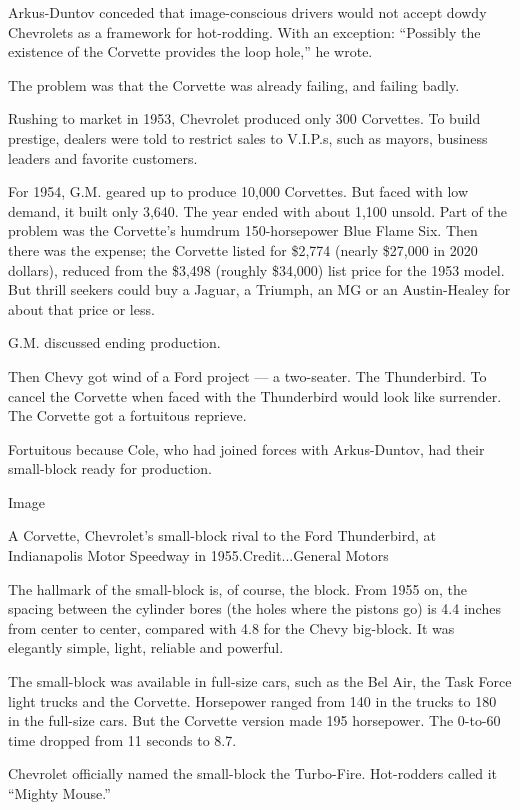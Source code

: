Arkus-Duntov conceded that image-conscious drivers would not accept
dowdy Chevrolets as a framework for hot-rodding. With an exception:
``Possibly the existence of the Corvette provides the loop hole,'' he
wrote.

The problem was that the Corvette was already failing, and failing
badly.

Rushing to market in 1953, Chevrolet produced only 300 Corvettes. To
build prestige, dealers were told to restrict sales to V.I.P.s, such as
mayors, business leaders and favorite customers.

For 1954, G.M. geared up to produce 10,000 Corvettes. But faced with low
demand, it built only 3,640. The year ended with about 1,100 unsold.
Part of the problem was the Corvette's humdrum 150-horsepower Blue Flame
Six. Then there was the expense; the Corvette listed for \$2,774 (nearly
\$27,000 in 2020 dollars), reduced from the \$3,498 (roughly \$34,000)
list price for the 1953 model. But thrill seekers could buy a Jaguar, a
Triumph, an MG or an Austin-Healey for about that price or less.

G.M. discussed ending production.

Then Chevy got wind of a Ford project --- a two-seater. The Thunderbird.
To cancel the Corvette when faced with the Thunderbird would look like
surrender. The Corvette got a fortuitous reprieve.

Fortuitous because Cole, who had joined forces with Arkus-Duntov, had
their small-block ready for production.

Image

A Corvette, Chevrolet's small-block rival to the Ford Thunderbird, at
Indianapolis Motor Speedway in 1955.Credit...General Motors

The hallmark of the small-block is, of course, the block. From 1955 on,
the spacing between the cylinder bores (the holes where the pistons go)
is 4.4 inches from center to center, compared with 4.8 for the Chevy
big-block. It was elegantly simple, light, reliable and powerful.

The small-block was available in full-size cars, such as the Bel Air,
the Task Force light trucks and the Corvette. Horsepower ranged from 140
in the trucks to 180 in the full-size cars. But the Corvette version
made 195 horsepower. The 0-to-60 time dropped from 11 seconds to 8.7.

Chevrolet officially named the small-block the Turbo-Fire. Hot-rodders
called it ``Mighty Mouse.''

